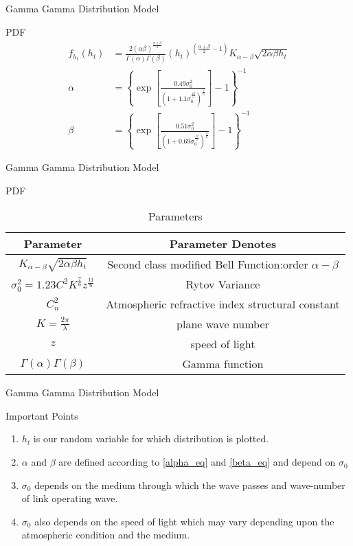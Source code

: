 \documentclass{beamer}
\begin{document}
\begin{frame}{Gamma Gamma Distribution Model}
    \begin{block}{PDF}
    \begin{align}
    f_{h_t}(h_t)&=\frac{2(\alpha \beta)^{\frac{\alpha+\beta}{2}}}{\Gamma{(\alpha)} \Gamma{(\beta)}}{(h_t)}^{(\frac{\alpha+\beta}{2}-1)}K_{\alpha-\beta}\sqrt{2\alpha\beta h_t}\\
    \alpha &= \left\{\exp{\left[\frac{0.49\sigma_0^2}{\left(1 +1.1\sigma_0^{\frac{12}{5}}\right)^\frac{7}{6}}\right]}-1\right\}^{-1} \label{alpha_eq}\\
    \beta &= \left\{\exp{\left[\frac{0.51\sigma_0^2}{\left(1 +0.69\sigma_0^{\frac{12}{5}}\right)^\frac{5}{6}}\right]}-1\right\}^{-1} \label{beta_eq}
\end{align}
    \end{block}
\end{frame}
\begin{frame}{Gamma Gamma Distribution Model}
    \begin{block}{PDF}
    \begin{table}[]
        \centering
\renewcommand{\arraystretch}{1.4}
        \begin{tabular}{|c|c|}
        \hline
             Parameter& Parameter Denotes \\ \hline
            $K_{\alpha-\beta}\sqrt{2\alpha\beta h_t}$ & Second class modified Bell Function:order  $\alpha-\beta$\\ \hline
            $\sigma_0^2=1.23C^2K^\frac{7}{6}z^\frac{11}{6}$&Rytov Variance\\ \hline
             $C_n^2$&Atmospheric refractive index structural constant\\ \hline
             $K=\frac{2\pi}{\lambda}$&plane wave number\\ \hline
             $z$ & speed of light\\ \hline
             $\Gamma(\alpha) \Gamma(\beta)$ & Gamma function\\
             \hline
        \end{tabular}
        \caption{Parameters}
        \label{tab:my_label}
    \end{table}
    \end{block}
\end{frame}
\begin{frame}{Gamma Gamma Distribution Model}
\begin{block}{Important Points}
\begin{enumerate}
\item $h_t$ is our random variable for which distribution is plotted.
    \item $\alpha$ and $\beta$ are defined according to \eqref{alpha_eq} and \eqref{beta_eq} and depend on $\sigma_0$ 
    \item$\sigma_0$ depends on the medium through which the wave passes and wave-number of link operating wave.
    \item $\sigma_0$ also depends on the speed of light which may vary depending upon the atmospheric condition and the medium.
    
\end{enumerate}
\end{block}
\end{frame}
\end{document}
